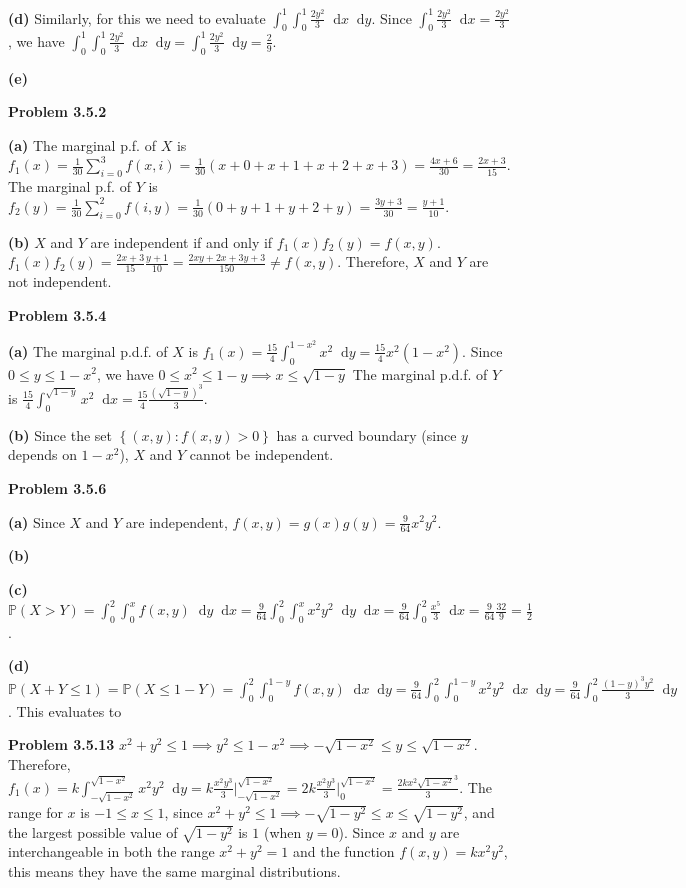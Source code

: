 \documentclass[11pt]{amsart}
\newcommand*\diff{\mathop{}\!\mathrm{d}}
\newcommand{\problem}[1]{\bigskip\noindent\textbf{Problem #1}}
\newcommand{\ppart}[1]{\bigskip\textbf{(#1)}}
\begin{document}
\ppart{d}
Similarly, for this we need to evaluate $\int_0^1 \int_0^1 \frac{2y^2}{3} \diff x \diff y$. Since $\int_0^1 \frac{2y^2}{3} \diff x = \frac{2y^2}{3}$, we have $\int_0^1 \int_0^1 \frac{2y^2}{3} \diff x \diff y = \int_0^1 \frac{2y^2}{3} \diff y = \frac{2}{9}$.

\ppart{e}


\problem{3.5.2}

\ppart{a}
The marginal p.f. of $X$ is $f_1(x) = \frac{1}{30}\sum_{i = 0}^3 f(x, i) = \frac{1}{30}(x + 0 + x + 1 + x + 2 + x + 3) = \frac{4x + 6}{30} = \frac{2x + 3}{15}$. The marginal p.f. of $Y$ is $f_2(y) = \frac{1}{30}\sum_{i = 0}^2 f(i, y) = \frac{1}{30}(0 + y + 1 + y + 2 + y) = \frac{3y + 3}{30} = \frac{y + 1}{10}$.

\ppart{b}
$X$ and $Y$ are independent if and only if $f_1(x)f_2(y) = f(x, y)$. $f_1(x)f_2(y) = \frac{2x + 3}{15}\frac{y + 1}{10} = \frac{2xy + 2x + 3y + 3}{150} \neq f(x, y)$. Therefore, $X$ and $Y$ are not independent.

\problem{3.5.4}

\ppart{a}
The marginal p.d.f. of $X$ is $f_1(x) = \frac{15}{4}\int_0^{1 - x^2} x^2 \diff y = \frac{15}{4}x^2(1 - x^2)$. Since $0 \leq y \leq 1 - x^2$, we have $0 \leq x^2 \leq 1 - y \implies x \leq \sqrt{1 - y}$ The marginal p.d.f. of $Y$ is $\frac{15}{4}\int_0^{\sqrt{1 - y}} x^2 \diff x = \frac{15}{4}\frac{(\sqrt{1 - y})^3}{3}$.

\ppart{b}
Since the set $\left\{ (x, y) : f(x, y) > 0 \right\}$ has a curved boundary (since $y$ depends on $1 - x^2$), $X$ and $Y$ cannot be independent.

\problem{3.5.6}

\ppart{a}
Since $X$ and $Y$ are independent, $f(x, y) = g(x)g(y) = \frac{9}{64}x^2y^2$.

\ppart{b}

\ppart{c}
$\mathbb{P}(X > Y) = \int_0^2 \int_0^x f(x, y) \diff y \diff x = \frac{9}{64}\int_0^2 \int_0^x x^2y^2 \diff y \diff x = \frac{9}{64}\int_0^2 \frac{x^5}{3} \diff x = \frac{9}{64}\frac{32}{9} = \frac{1}{2}$.

\ppart{d}
$\mathbb{P}(X + Y \leq 1) = \mathbb{P}(X \leq 1 - Y) = \int_0^2 \int_0^{1 - y} f(x, y) \diff x \diff y = \frac{9}{64}\int_0^2 \int_0^{1 - y} x^2y^2 \diff x \diff y = \frac{9}{64}\int_0^2 \frac{(1 - y)^3y^2}{3} \diff y$. This evaluates to

\problem{3.5.13}
$x^2 + y^2 \leq 1 \implies y^2 \leq 1 - x^2 \implies -\sqrt{1 - x^2} \leq y \leq \sqrt{1 - x^2}$. Therefore, $f_1(x) = k\int_{-\sqrt{1 - x^2}}^{\sqrt{1 - x^2}} x^2y^2 \diff y = k \frac{x^2y^3}{3} \Big|_{-\sqrt{1 - x^2}}^{\sqrt{1 - x^2}} = 2k \frac{x^2y^3}{3} \Big|_0^{\sqrt{1 - x^2}} = \frac{2kx^2\sqrt{1 - x^2}^3}{3}$. The range for $x$ is $-1 \leq x \leq 1$, since $x^2 + y^2 \leq 1 \implies -\sqrt{1 - y^2} \leq x \leq \sqrt{1 - y^2}$, and the largest possible value of $\sqrt{1 - y^2}$ is $1$ (when $y = 0$). Since $x$ and $y$ are interchangeable in both the range $x^2 + y^2 = 1$ and the function $f(x, y) = kx^2y^2$, this means they have the same marginal distributions.
\end{document}
